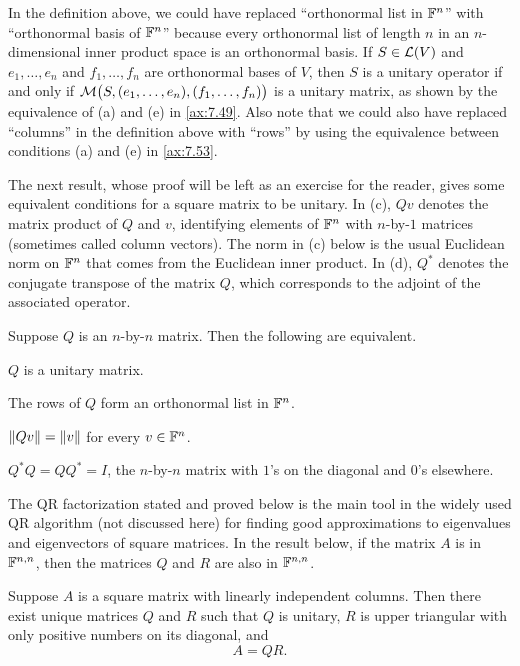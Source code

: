 In the definition above, we could have replaced ``orthonormal list in $\mathbb{F}^n$''
with ``orthonormal basis of $\mathbb{F}^n$'' because every orthonormal list of length
$n$ in an $n$-dimensional inner product space is an orthonormal basis. If
$S\in\mathcal{L}(V)$ and $e_1,\dots,e_n$ and $f_1,\dots,f_n$ are orthonormal bases of
$V$, then $S$ is a unitary operator if and only if
$\mathcal{M}\bigl(S,(e_1,\dots,e_n),(f_1,\dots,f_n)\bigr)$ is a unitary matrix, as
shown by the equivalence of (a) and (e) in \ref{ax:7.49}. Also note that we
could also have replaced ``columns'' in the definition above with ``rows'' by
using the equivalence between conditions (a) and (e) in \ref{ax:7.53}.

The next result, whose proof will be left as an exercise for the reader, gives
some equivalent conditions for a square matrix to be unitary. In (c), $Qv$
denotes the matrix product of $Q$ and $v$, identifying elements of $\mathbb{F}^n$ with
$n$-by-$1$ matrices (sometimes called column vectors). The norm in (c) below is
the usual Euclidean norm on $\mathbb{F}^n$ that comes from the Euclidean inner product.
In (d), $Q^*$ denotes the conjugate transpose of the matrix $Q$, which
corresponds to the adjoint of the associated operator.

\begin{result}\label{ax:7.57}
Suppose $Q$ is an $n$-by-$n$ matrix. Then the following are equivalent.
\begin{parts}
\item $Q$ is a unitary matrix.
\item The rows of $Q$ form an orthonormal list in $\mathbb{F}^n$.
\item $\lVert Qv \rVert=\lVert v \rVert$ for every $v\in\mathbb{F}^n$.
\item $Q^*Q=QQ^*=I$, the $n$-by-$n$ matrix with $1$'s on the diagonal and $0$'s
  elsewhere.
\end{parts}
\end{result}

The QR factorization stated and proved below is the main tool in the widely
used QR algorithm (not discussed here) for finding good approximations to
eigenvalues and eigenvectors of square matrices. In the result below, if the
matrix $A$ is in $\mathbb{F}^{n,n}$, then the matrices $Q$ and $R$ are also in
$\mathbb{F}^{n,n}$.

\begin{result}[QR factorization]\label{ax:7.58}
Suppose $A$ is a square matrix with linearly independent columns. Then there
exist unique matrices $Q$ and $R$ such that $Q$ is unitary, $R$ is upper
triangular with only positive numbers on its diagonal, and
\[ A=QR. \]
\end{result}

